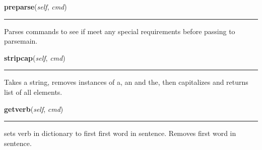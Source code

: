    \label{Lib:mudParser:mudparse:preparse}

    \vspace{0.5ex}

    \begin{boxedminipage}{\textwidth}

    \raggedright \textbf{preparse}(\textit{self}, \textit{cmd})

    \vspace{-1.5ex}

    \rule{\textwidth}{0.5\fboxrule}
    Parses commands to see if meet any special requirements before passing 
    to parsemain.

    \vspace{1ex}

    \end{boxedminipage}

    \label{Lib:mudParser:mudparse:stripcap}

    \vspace{0.5ex}

    \begin{boxedminipage}{\textwidth}

    \raggedright \textbf{stripcap}(\textit{self}, \textit{cmd})

    \vspace{-1.5ex}

    \rule{\textwidth}{0.5\fboxrule}
    Takes a string, removes instances of a, an and the, then capitalizes 
    and returns list of all elements.

    \vspace{1ex}

    \end{boxedminipage}

    \label{Lib:mudParser:mudparse:getverb}

    \vspace{0.5ex}

    \begin{boxedminipage}{\textwidth}

    \raggedright \textbf{getverb}(\textit{self}, \textit{cmd})

    \vspace{-1.5ex}

    \rule{\textwidth}{0.5\fboxrule}
    sets verb in dictionary to first first word in sentence. Removes first 
    word in sentence.

    \vspace{1ex}

    \end{boxedminipage}

